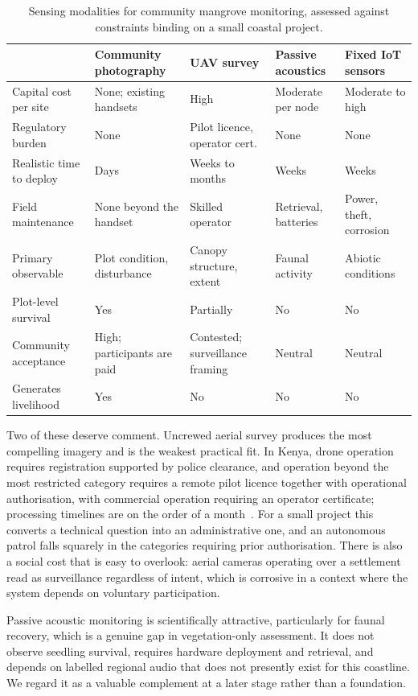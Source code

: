 \documentclass[10pt,twocolumn,a4paper]{article}
\begin{document}
\begin{table}[t]
\centering
\small
\caption{Sensing modalities for community mangrove monitoring, assessed against
constraints binding on a small coastal project.}
\label{tab:modalities}
\begin{tabular}{@{}lllll@{}}
\toprule
& \textbf{Community photography} & \textbf{UAV survey} & \textbf{Passive acoustics} & \textbf{Fixed IoT sensors} \\
\midrule
Capital cost per site & None; existing handsets & High & Moderate per node & Moderate to high \\
Regulatory burden & None & Pilot licence, operator cert. & None & None \\
Realistic time to deploy & Days & Weeks to months & Weeks & Weeks \\
Field maintenance & None beyond the handset & Skilled operator & Retrieval, batteries & Power, theft, corrosion \\
Primary observable & Plot condition, disturbance & Canopy structure, extent & Faunal activity & Abiotic conditions \\
Plot-level survival & Yes & Partially & No & No \\
Community acceptance & High; participants are paid & Contested; surveillance framing & Neutral & Neutral \\
Generates livelihood & Yes & No & No & No \\
\bottomrule
\end{tabular}
\end{table}

Two of these deserve comment. Uncrewed aerial survey produces the most
compelling imagery and is the weakest practical fit. In Kenya, drone operation
requires registration supported by police clearance, and operation beyond the
most restricted category requires a remote pilot licence together with
operational authorisation, with commercial operation requiring an operator
certificate; processing timelines are on the order of a
month~\cite{kcaa}. For a small project this converts a technical question into an
administrative one, and an autonomous patrol falls squarely in the categories
requiring prior authorisation. There is also a social cost that is easy to
overlook: aerial cameras operating over a settlement read as surveillance
regardless of intent, which is corrosive in a context where the system depends on
voluntary participation.

Passive acoustic monitoring is scientifically attractive, particularly for
faunal recovery, which is a genuine gap in vegetation-only assessment. It does
not observe seedling survival, requires hardware deployment and retrieval, and
depends on labelled regional audio that does not presently exist for this
coastline. We regard it as a valuable complement at a later stage rather than a
foundation.
\end{document}
